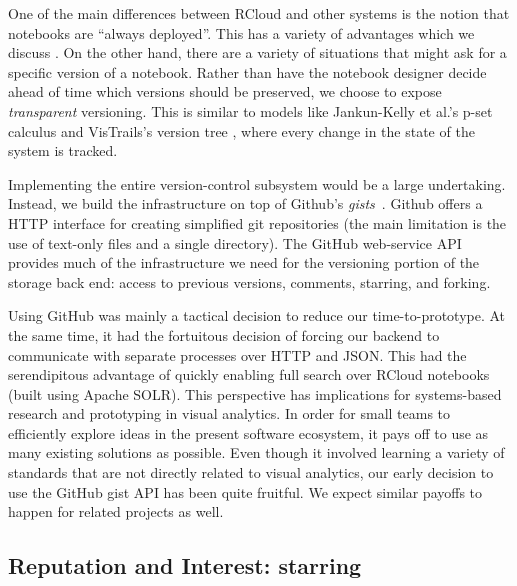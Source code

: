 One of the main differences between RCloud and other systems is the
notion that notebooks are ``always deployed''. This has a variety of
advantages which we discuss . On the other hand, there
are a variety of situations that might ask for a specific version of a
notebook. Rather than have the notebook designer decide ahead of time
which versions should be preserved, we choose to expose
\emph{transparent} versioning. This is similar to models like
Jankun-Kelly et al.'s p-set calculus  and VisTrails's
version tree , where every change in the state of the
system is tracked.

Implementing the entire version-control subsystem would be a large
undertaking. Instead, we build the infrastructure on top of Github's
\emph{gists}~. Github offers a HTTP interface
for creating simplified git repositories (the main limitation is the
use of text-only files and a single directory). The GitHub web-service
API provides much of the infrastructure we need for the versioning
portion of the storage back end: access to previous versions,
comments, starring, and forking.

Using GitHub was mainly a tactical decision to reduce our
time-to-prototype. At the same time, it had the fortuitous decision of
forcing our backend to communicate with separate processes over HTTP
and JSON. This had the serendipitous advantage of quickly enabling
full search over RCloud notebooks (built using Apache SOLR).
%
This perspective has implications for
systems-based research and prototyping in visual analytics.
%
In order for small teams to efficiently explore ideas in the present
software ecosystem, it pays off to use as many existing solutions as
possible.
%
Even though it involved learning a variety of standards that are not
directly related to visual analytics, our early decision to use the
GitHub gist API has been quite fruitful. We expect similar payoffs to
happen for related projects as well.


\subsection{Reputation and Interest: starring\label{sec:starring}}

